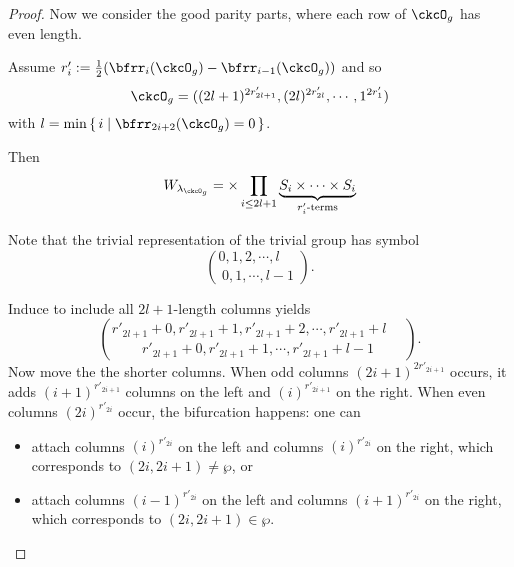 \documentclass[12pt,a4paper]{amsart}
\numberwithin{equation}{section}
\theoremstyle{remark}
\def\half{{\tfrac{1}{2}}}
\def\lamckg{\lambda_{\ckcO_g}}
\begin{document}
\begin{proof}
{      Now we consider the good parity parts, where each row of $\ckcO_{g}$ has
      even length.

      Assume $r'_{i} := \half(\bfrr_{i}(\ckcO_{g})-\bfrr_{i-1}(\ckcO_{g}))$ and
      so
      \[
        \ckcO_{g} %
        = ((2l+1)^{2r'_{2l+1}}, (2l)^{2r'_{2l}},\cdots, 1^{2r'_{1}})
      \]
      with $l =\min\set{i|\bfrr_{2i+2}(\ckcO_{g}) = 0}$.

      Then
      \[
        W_{\lamckg} = \times \prod_{i\leq 2l+1} \underbrace{S_{i}\times \cdots\times S_{i}}_{r'_{i}\text{-terms}}
      \]

      Note that the trivial representation of the trivial group has symbol
      \[
        \binom{0,1, 2, \cdots, l\phantom{-1}}{0,1, \cdots, l-1}.
      \]


      Induce to include all $2l+1$-length columns yields
      \[
        \binom{r'_{2l+1}+0,r'_{2l+1}+1,r'_{2l+1}+2,\cdots, r'_{2l+1}+l\phantom{-1}}{ r'_{2l+1}+0,r'_{2l+1}+1, \cdots, r'_{2l+1}+l-1}.
      \]
      Now move the the shorter columns. When odd columns $(2i+1)^{2r'_{2i+1}}$
      occurs, it adds $(i+1)^{r'_{2i+1}}$ columns on the left and
      $(i)^{r'_{2i+1}}$ on the right. When even columns $(2i)^{r'_{2i}}$ occur,
      the bifurcation happens: one can
      \begin{itemize}
        \item attach columns $(i)^{r'_{2i}}$ on the left and columns
              $(i)^{r'_{2i}}$ on the right, which corresponds to
              $(2i,2i+1)\neq \wp$, or
        \item attach columns $(i-1)^{r'_{2i}}$ on the left and columns
              $(i+1)^{r'_{2i}}$ on the right, which corresponds to
              $(2i,2i+1)\in \wp$.
      \end{itemize}


}
\end{proof}
\end{document}
